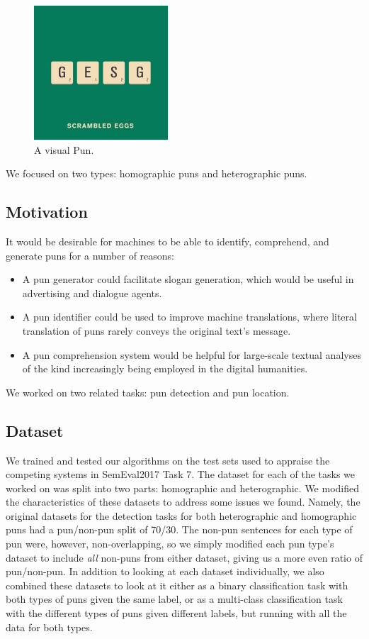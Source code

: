 \documentclass{article}
\begin{document}
\begin{figure}
\centering
\includegraphics[width=5cm]{figures/visual_pun.jpg}
\caption{A visual Pun.}\label{fig:visual_pun}
\end{figure}

We focused on two types: homographic puns and heterographic puns. 

\subsection{Motivation}

It would be desirable for machines to be able to identify, comprehend, and
generate puns for a number of reasons:

\begin{itemize}
	\item A pun generator could facilitate slogan generation, which would be
		useful in advertising and dialogue agents.
	\item A pun identifier could be used to improve machine translations, where
		literal translation of puns rarely conveys the original text's message.
	\item A pun comprehension system would be helpful for large-scale textual
		analyses of the kind increasingly being employed in the digital
		humanities.
\end{itemize}

We worked on two related tasks: pun detection and pun location.

\subsection{Dataset}

We trained and tested our algorithms on the test sets used to appraise the
competing systems in SemEval2017 Task 7. The dataset for each of the tasks we
worked on was split into two parts: homographic and heterographic. We modified
the characteristics of these datasets to address some issues we found. Namely,
the original datasets for the detection tasks for both heterographic and
homographic puns had a pun/non-pun split of 70/30. The non-pun sentences for
each type of pun were, however, non-overlapping, so we simply modified each pun
type's dataset to include \emph{all} non-puns from either dataset, giving us a
more even ratio of pun/non-pun. In addition to looking at each dataset
individually, we also combined these datasets to look at it either as a binary
classification task with both types of puns given the same label, or as a
multi-class classification task with the different types of puns given
different labels, but running with all the data for both types.
\end{document}
